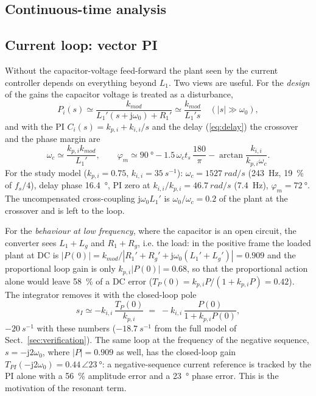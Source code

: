 \documentclass[10pt,a4paper]{scrartcl}
\newcommand{\ts}{t_s}
\newcommand{\wo}{\omega_0}
\newcommand{\kmod}{k_{mod}}
\newcommand{\kpi}{k_{p,i}}
\newcommand{\kii}{k_{i,i}}
\newcommand{\jj}{\mathrm{j}}
\begin{document}
\begin{onehalfspace}
\section{Continuous-time analysis}
\label{sec:analysis}

\subsection{Current loop: vector PI}
\label{sec:currentloop}

Without the capacitor-voltage feed-forward the plant seen by the current controller depends on everything beyond $L_1$. Two views are useful. For the \emph{design} of the gains the capacitor voltage is treated as a disturbance,
\begin{equation}
P_{i}(s) \simeq \frac{\kmod}{L_1'(s + \jj\wo) + R_1'} \simeq \frac{\kmod}{L_1' s} \quad (|s| \gg \wo),
\label{eq:plant_design}
\end{equation}
and with the PI $C_i(s) = \kpi + \kii/s$ and the delay (\ref{eq:delay}) the crossover and the phase margin are
\begin{equation}
\omega_c \simeq \frac{\kpi\kmod}{L_1'}, \qquad
\varphi_m \simeq \SI{90}{\degree} - 1.5\,\omega_c\ts\,\frac{180}{\pi} - \arctan\frac{\kii}{\kpi\omega_c}.
\label{eq:pm}
\end{equation}
For the study model ($\kpi = 0.75$, $\kii = \SI{35}{s^{-1}}$): $\omega_c = \SI{1527}{rad/s}$ (\SI{243}{Hz}, \SI{19}{\percent} of $f_s/4$), delay phase \SI{16.4}{\degree}, PI zero at $\kii/\kpi = \SI{46.7}{rad/s}$ (\SI{7.4}{Hz}), $\varphi_m = \SI{72}{\degree}$. The uncompensated cross-coupling $\jj\wo L_1'$ is $\wo/\omega_c = 0.2$ of the plant at the crossover and is left to the loop.

For the \emph{behaviour at low frequency}, where the capacitor is an open circuit, the converter sees $L_1 + L_g$ and $R_1 + R_g$, i.e. the load: in the positive frame the loaded plant at DC is $|P(0)| = \kmod/|R_1' + R_g' + \jj\wo(L_1' + L_g')| = 0.909$ and the proportional loop gain is only $\kpi|P(0)| = 0.68$, so that the proportional action alone would leave \SI{58}{\percent} of a DC error ($T_P(0) = \kpi P/(1 + \kpi P) = 0.42$). The integrator removes it with the closed-loop pole
\begin{equation}
s_I \simeq -\kii\,\frac{T_P(0)}{\kpi} \;=\; -\kii\,\frac{P(0)}{1 + \kpi P(0)},
\label{eq:integrator_pole}
\end{equation}
$\SI{-20}{s^{-1}}$ with these numbers ($\SI{-18.7}{s^{-1}}$ from the full model of Sect.~\ref{sec:verification}). The same loop at the frequency of the negative sequence, $s = -\jj 2\wo$, where $|P| = 0.909$ as well, has the closed-loop gain $T_{PI}(-\jj2\wo) = 0.44\,\angle\SI{+23}{\degree}$: a negative-sequence current reference is tracked by the PI alone with a \SI{56}{\percent} amplitude error and a \SI{23}{\degree} phase error. This is the motivation of the resonant term.


\end{onehalfspace}
\end{document}
